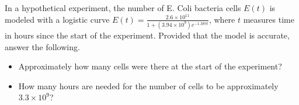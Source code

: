 \begin{frame}
\begin{example}
In a hypothetical experiment, the number of E. Coli bacteria cells $E(t)$ is modeled with a logistic curve $\displaystyle E(t)= \frac{2.6\times 10^{11}}{1+ (3.94\times 10^9) e^{-1.387t }} $, where $t$ measures time in hours since the start of the experiment. Provided that the model is accurate, answer the following.
\begin{itemize}
\item Approximately how many cells were there at the start of the experiment?
\item How many hours are needed for the number of cells to be approximately $3.3\times 10^{9}$?
\end{itemize}
\end{example}

\end{frame}